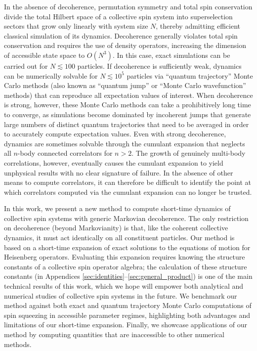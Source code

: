 \documentclass[aps,pra,twocolumn,longbibliography]{revtex4-2}
\newcommand{\p}[1]{\left( #1 \right)} %
\newcommand{\1}{\mathds{1}}
\begin{document}
In the absence of decoherence, permutation symmetry and total spin
conservation divide the total Hilbert space of a collective spin
system into superselection sectors that grow only linearly with system
size $N$, thereby admitting efficient classical simulation of its
dynamics.  Decoherence generally violates total spin conservation and
requires the use of density operators, increasing the dimension of
accessible state space to $O\p{N^3}$\cite{hartmann2016generalized,
  xu2013simulating}.  In this case, exact simulations can be carried
out for $N\lesssim100$ particles.  If decoherence is sufficiently
weak, dynamics can be numerically solvable for $N\lesssim10^5$
particles via ``quantum trajectory'' Monte Carlo
methods\cite{plenio1998quantumjump, zhang2018montecarlo} (also known
as ``quantum jump'' or ``Monte Carlo wavefunction'' methods) that can
reproduce all expectation values of interest.  When decoherence is
strong, however, these Monte Carlo methods can take a prohibitively
long time to converge, as simulations become dominated by incoherent
jumps that generate large numbers of distinct quantum trajectories
that need to be averaged in order to accurately compute expectation
values.  Even with strong decoherence, dynamics are sometimes solvable
through the cumulant expansion\cite{meiser2010steadystate} that
neglects all $n$-body connected correlators for $n>2$.  The growth of
genuinely multi-body correlations, however, eventually causes the
cumulant expansion to yield unphysical results with no clear signature
of failure.  In the absence of other means to compute correlators, it
can therefore be difficult to identify the point at which correlators
computed via the cumulant expansion can no longer be trusted.

In this work, we present a new method to compute short-time dynamics
of collective spin systems with generic Markovian decoherence.  The
only restriction on decoherence (beyond Markovianity) is that, like
the coherent collective dynamics, it must act identically on all
constituent particles.  Our method is based on a short-time expansion
of exact solutions to the equations of motion for Heisenberg
operators.  Evaluating this expansion requires knowing the structure
constants of a collective spin operator algebra; the calculation of
these structure constants (in Appendices
\ref{sec:identities}--\ref{sec:general_product}) is one of the main
technical results of this work, which we hope will empower both
analytical and numerical studies of collective spin systems in the
future.  We benchmark our method against both exact and quantum
trajectory Monte Carlo computations of spin squeezing in accessible
parameter regimes, highlighting both advantages and limitations of our
short-time expansion.  Finally, we showcase applications of our method
by computing quantities that are inaccessible to other numerical
methods.
\end{document}
